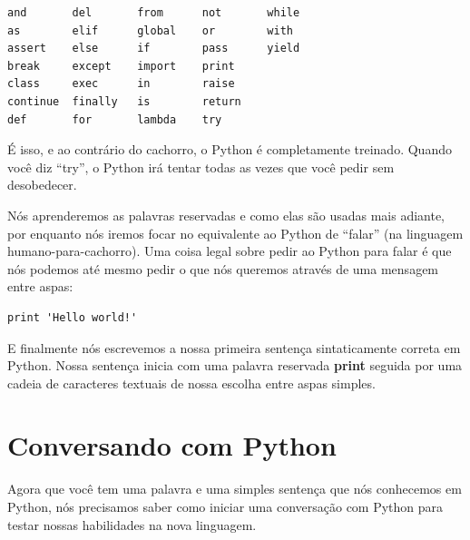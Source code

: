 \beforeverb
\begin{verbatim}
and       del       from      not       while
as        elif      global    or        with
assert    else      if        pass      yield
break     except    import    print
class     exec      in        raise
continue  finally   is        return
def       for       lambda    try
\end{verbatim}
\afterverb
%

É isso, e ao contrário do cachorro, o Python é completamente treinado.
Quando você diz ``try'', o Python irá tentar todas as vezes que você pedir
sem desobedecer.
%

Nós aprenderemos as palavras reservadas e como elas são usadas mais adiante,
por enquanto nós iremos focar no equivalente ao Python de ``falar'' (na
linguagem humano-para-cachorro). Uma coisa legal sobre pedir ao Python para falar
é que nós podemos até mesmo pedir o que nós queremos através de uma mensagem
entre aspas:
%

\beforeverb
\begin{verbatim}
print 'Hello world!'
\end{verbatim}
\afterverb
%

E finalmente nós escrevemos a nossa primeira sentença sintaticamente correta em Python.
Nossa sentença inicia com uma palavra reservada {\bf print} seguida por
uma cadeia de caracteres textuais de nossa escolha entre aspas simples.
%

\section{Conversando com Python}
%

Agora que você tem uma palavra e uma simples sentença que nós conhecemos em Python,
nós precisamos saber como iniciar uma conversação com Python para testar
nossas habilidades na nova linguagem.
%


